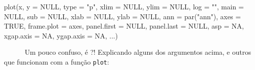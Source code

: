 \documentclass[
  letterpaper,
  DIV=11,
  numbers=noendperiod]{scrreprt}
\newenvironment{Shaded}{\begin{snugshade}}{\end{snugshade}}
\newcommand{\AttributeTok}[1]{\textcolor[rgb]{0.40,0.45,0.13}{#1}}
\newcommand{\ConstantTok}[1]{\textcolor[rgb]{0.56,0.35,0.01}{#1}}
\newcommand{\FunctionTok}[1]{\textcolor[rgb]{0.28,0.35,0.67}{#1}}
\newcommand{\NormalTok}[1]{\textcolor[rgb]{0.00,0.23,0.31}{#1}}
\newcommand{\StringTok}[1]{\textcolor[rgb]{0.13,0.47,0.30}{#1}}
\begin{document}
\begin{Shaded}
\begin{Highlighting}[]
\FunctionTok{plot}\NormalTok{(x, }\AttributeTok{y =} \ConstantTok{NULL}\NormalTok{, }\AttributeTok{type =} \StringTok{"p"}\NormalTok{,  }\AttributeTok{xlim =} \ConstantTok{NULL}\NormalTok{, }\AttributeTok{ylim =} \ConstantTok{NULL}\NormalTok{,}
     \AttributeTok{log =} \StringTok{""}\NormalTok{, }\AttributeTok{main =} \ConstantTok{NULL}\NormalTok{, }\AttributeTok{sub =} \ConstantTok{NULL}\NormalTok{, }\AttributeTok{xlab =} \ConstantTok{NULL}\NormalTok{, }\AttributeTok{ylab =} \ConstantTok{NULL}\NormalTok{,}
     \AttributeTok{ann =} \FunctionTok{par}\NormalTok{(}\StringTok{"ann"}\NormalTok{), }\AttributeTok{axes =} \ConstantTok{TRUE}\NormalTok{, }\AttributeTok{frame.plot =}\NormalTok{ axes,}
     \AttributeTok{panel.first =} \ConstantTok{NULL}\NormalTok{, }\AttributeTok{panel.last =} \ConstantTok{NULL}\NormalTok{, }\AttributeTok{asp =} \ConstantTok{NA}\NormalTok{,}
     \AttributeTok{xgap.axis =} \ConstantTok{NA}\NormalTok{, }\AttributeTok{ygap.axis =} \ConstantTok{NA}\NormalTok{,}
\NormalTok{     ...)}
\end{Highlighting}
\end{Shaded}

~~~~~~Um pouco confuso, é ?! Explicando alguns dos argumentos acima, e
outros que funcionam com a função \texttt{plot}:
\end{document}
